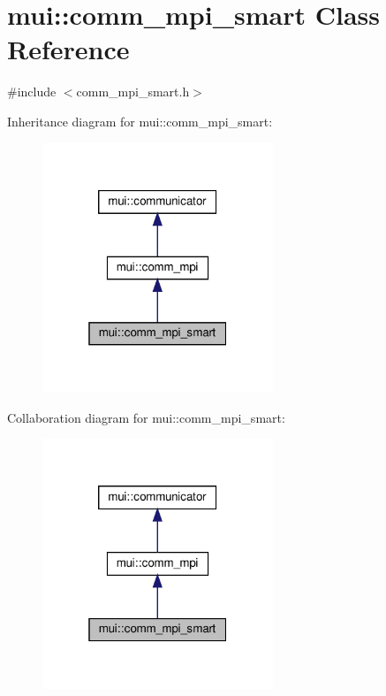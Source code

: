\hypertarget{classmui_1_1comm__mpi__smart}{}\section{mui\+:\+:comm\+\_\+mpi\+\_\+smart Class Reference}
\label{classmui_1_1comm__mpi__smart}


{\ttfamily \#include $<$comm\+\_\+mpi\+\_\+smart.\+h$>$}



Inheritance diagram for mui\+:\+:comm\+\_\+mpi\+\_\+smart\+:
\nopagebreak
\begin{figure}[H]
\begin{center}
\leavevmode
\includegraphics[width=196pt]{classmui_1_1comm__mpi__smart__inherit__graph}
\end{center}
\end{figure}


Collaboration diagram for mui\+:\+:comm\+\_\+mpi\+\_\+smart\+:
\nopagebreak
\begin{figure}[H]
\begin{center}
\leavevmode
\includegraphics[width=196pt]{classmui_1_1comm__mpi__smart__coll__graph}
\end{center}
\end{figure}
